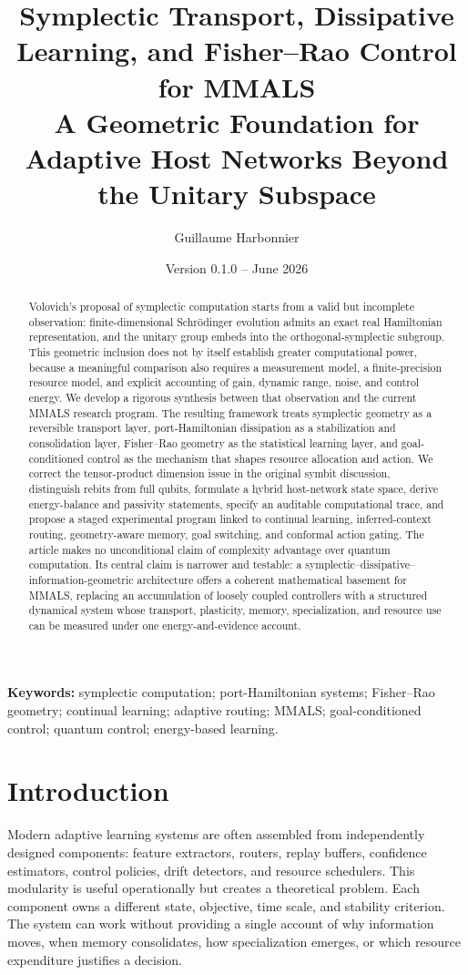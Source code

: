 \documentclass[11pt]{article}
\title{\textbf{Symplectic Transport, Dissipative Learning, and Fisher--Rao Control for MMALS}\\\large A Geometric Foundation for Adaptive Host Networks Beyond the Unitary Subspace}
\author[1]{Guillaume Harbonnier}
\affil[1]{Independent MMALS Research Program\\\texttt{https://github.com/gharbonnier78}}
\date{Version 0.1.0 -- June 2026}
\theoremstyle{definition}\newtheorem{definition}{Definition}\newtheorem{assumption}{Assumption}
\theoremstyle{remark}\newtheorem{remark}{Remark}
\begin{document}
\maketitle

\begin{abstract}
Volovich's proposal of symplectic computation starts from a valid but incomplete observation: finite-dimensional Schrödinger evolution admits an exact real Hamiltonian representation, and the unitary group embeds into the orthogonal-symplectic subgroup. This geometric inclusion does not by itself establish greater computational power, because a meaningful comparison also requires a measurement model, a finite-precision resource model, and explicit accounting of gain, dynamic range, noise, and control energy. We develop a rigorous synthesis between that observation and the current MMALS research program. The resulting framework treats symplectic geometry as a reversible transport layer, port-Hamiltonian dissipation as a stabilization and consolidation layer, Fisher--Rao geometry as the statistical learning layer, and goal-conditioned control as the mechanism that shapes resource allocation and action. We correct the tensor-product dimension issue in the original symbit discussion, distinguish rebits from full qubits, formulate a hybrid host-network state space, derive energy-balance and passivity statements, specify an auditable computational trace, and propose a staged experimental program linked to continual learning, inferred-context routing, geometry-aware memory, goal switching, and conformal action gating. The article makes no unconditional claim of complexity advantage over quantum computation. Its central claim is narrower and testable: a symplectic--dissipative--information-geometric architecture offers a coherent mathematical basement for MMALS, replacing an accumulation of loosely coupled controllers with a structured dynamical system whose transport, plasticity, memory, specialization, and resource use can be measured under one energy-and-evidence account.
\end{abstract}

\noindent\textbf{Keywords:} symplectic computation; port-Hamiltonian systems; Fisher--Rao geometry; continual learning; adaptive routing; MMALS; goal-conditioned control; quantum control; energy-based learning.

\section{Introduction}
Modern adaptive learning systems are often assembled from independently designed components: feature extractors, routers, replay buffers, confidence estimators, control policies, drift detectors, and resource schedulers. This modularity is useful operationally but creates a theoretical problem. Each component owns a different state, objective, time scale, and stability criterion. The system can work without providing a single account of why information moves, when memory consolidates, how specialization emerges, or which resource expenditure justifies a decision.
\end{document}
